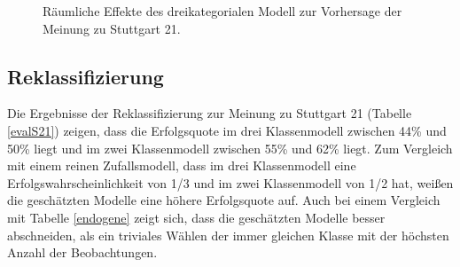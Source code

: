 \documentclass{Vorlage}
\begin{document}
\begin{figure}[htbp]
  \caption{Räumliche Effekte des dreikategorialen Modell zur Vorhersage der Meinung zu Stuttgart 21.}
  \label{rEffS21}
\end{figure}

\subsection{Reklassifizierung}

Die Ergebnisse der Reklassifizierung zur Meinung zu Stuttgart 21 (Tabelle \ref{evalS21}) zeigen, dass die Erfolgsquote im drei Klassenmodell zwischen 44\% und 50\% liegt und im zwei Klassenmodell zwischen 55\% und 62\% liegt. Zum Vergleich mit einem reinen Zufallsmodell, dass im drei Klassenmodell eine Erfolgswahrscheinlichkeit von 1/3 und im zwei Klassenmodell von 1/2 hat, weißen die geschätzten Modelle eine höhere Erfolgsquote auf. Auch bei einem Vergleich mit Tabelle \ref{endogene} zeigt sich, dass die geschätzten Modelle besser abschneiden, als ein triviales Wählen der immer gleichen Klasse mit der höchsten Anzahl der Beobachtungen.
\end{document}
